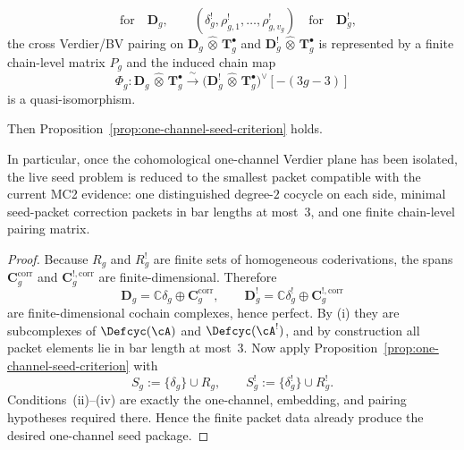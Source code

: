 \begin{proposition}
\begin{enumerate}[label=\textup{(\roman*)}]
\[  \quad\text{for}\quad \mathbf{D}_g,
  \qquad
  (\delta_g^!,\rho_{g,1}^!,\ldots,\rho_{g,v_g}^!)
  \quad\text{for}\quad \mathbf{D}_g^!,
  \]
  the cross Verdier/BV pairing on
  $\mathbf{D}_g \,\widehat{\otimes}\, \mathbf{T}_g^\bullet$ and
  $\mathbf{D}_g^! \,\widehat{\otimes}\, \mathbf{T}_g^\bullet$
  is represented by a finite chain-level matrix $P_g$ and the induced
  chain map
  \[
  \Phi_g \colon
  \mathbf{D}_g \,\widehat{\otimes}\, \mathbf{T}_g^\bullet
  \xrightarrow{\;\sim\;}
  \bigl(
    \mathbf{D}_g^! \,\widehat{\otimes}\, \mathbf{T}_g^\bullet
  \bigr)^\vee[-(3g{-}3)]
  \]
  is a quasi-isomorphism.
\end{enumerate}
Then Proposition~\ref{prop:one-channel-seed-criterion} holds.

In particular, once the cohomological one-channel Verdier plane has
been isolated, the live seed problem is reduced to the smallest packet
compatible with the current MC2 evidence: one distinguished degree-$2$
cocycle on each side, minimal seed-packet correction packets in bar
lengths at most~$3$, and one finite chain-level pairing matrix.
\end{proposition}

\begin{proof}
Because $R_g$ and $R_g^!$ are finite sets of homogeneous
coderivations, the spans
$\mathbf{C}_g^{\mathrm{corr}}$ and
$\mathbf{C}_g^{!,\mathrm{corr}}$ are finite-dimensional.  Therefore
\[
\mathbf{D}_g = \mathbb{C}\delta_g \oplus \mathbf{C}_g^{\mathrm{corr}},
\qquad
\mathbf{D}_g^! = \mathbb{C}\delta_g^! \oplus \mathbf{C}_g^{!,\mathrm{corr}}
\]
are finite-dimensional cochain complexes, hence perfect.  By
\textup{(i)} they are subcomplexes of
$\Defcyc(\cA)$ and $\Defcyc(\cA^!)$, and by construction all packet
elements lie in bar length at most~$3$.
Now apply Proposition~\ref{prop:one-channel-seed-criterion} with
\[
S_g := \{\delta_g\}\cup R_g,
\qquad
S_g^! := \{\delta_g^!\}\cup R_g^!.
\]
Conditions~\textup{(ii)}--\textup{(iv)} are exactly the one-channel,
embedding, and pairing hypotheses required there.  Hence the finite
packet data already produce the desired one-channel seed package.
\end{proof}

